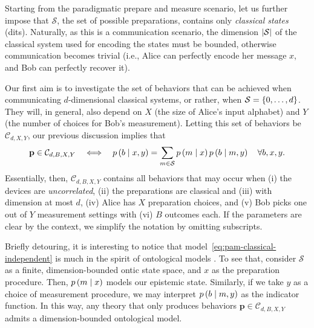             Starting from the paradigmatic prepare and measure scenario, let us further impose that $\mathcal{S}$, the set of possible preparations, contains only \emph{classical states} (dits). Naturally, as this is a communication scenario, the dimension $\abs{\mathcal{S}}$ of the classical system used for encoding the states must be bounded, otherwise communication becomes trivial (i.e., Alice can perfectly encode her message $x$, and Bob can perfectly recover it).
            
            Our first aim is to investigate the set of behaviors that can be achieved when communicating $d$-dimensional classical systems, or rather, when  $\mathcal{S} = \{ 0, \ldots, d \}$. They will, in general, also depend on $X$ (the size of Alice's input alphabet) and $Y$ (the number of choices for Bob's measurement). Letting this set of behaviors be $\mathcal{C}_{d,X,Y}$, our previous discussion implies that
            \begin{equation}
                \mathbf{p} \in \mathcal{C}_{d,B,X,Y} \quad\Longleftrightarrow \quad p \left( b \mid x,y \right) = \sum_{m \in \mathcal{S}} p \left( m \mid x \right) p \left( b \mid m,y \right) \quad\forall b,x,y .
                \label{eq:pam-classical-independent}
            \end{equation}
            Essentially, then, $\mathcal{C}_{d,B,X,Y}$ contains all behaviors that may occur when (i) the devices are \emph{uncorrelated}, (ii) the preparations are classical and (iii) with dimension at most $d$, (iv) Alice has $X$ preparation choices, and (v) Bob picks one out of $Y$ measurement settings with (vi) $B$ outcomes each. If the parameters are clear by the context, we simplify the notation by omitting subscripts.
            
            Briefly detouring, it is interesting to notice that model~\eqref{eq:pam-classical-independent} is much in the spirit of ontological models \cite{spekkens_2005_contextuality,harrigan_2008_ontological,galvao_2009_economical}. To see that, consider $\mathcal{S}$ as a finite, dimension-bounded ontic state space, and $x$ as the preparation procedure. Then, $p \left( m \mid x \right)$ models our epistemic state. Similarly, if we take $y$ as a choice of measurement procedure, we may interpret $p \left( b \mid m,y \right)$ as the indicator function. In this way, any theory that only produces behaviors $\mathbf{p} \in \mathcal{C}_{d,B,X,Y}$ admits a dimension-bounded ontological model.
            
